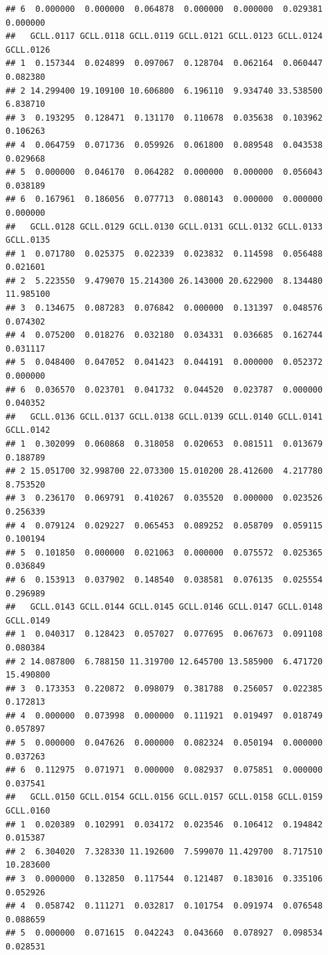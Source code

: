 \documentclass[
]{article}
\begin{document}
\begin{verbatim}
## 6  0.000000  0.000000  0.064878  0.000000  0.000000  0.029381  0.000000
##   GCLL.0117 GCLL.0118 GCLL.0119 GCLL.0121 GCLL.0123 GCLL.0124 GCLL.0126
## 1  0.157344  0.024899  0.097067  0.128704  0.062164  0.060447  0.082380
## 2 14.299400 19.109100 10.606800  6.196110  9.934740 33.538500  6.838710
## 3  0.193295  0.128471  0.131170  0.110678  0.035638  0.103962  0.106263
## 4  0.064759  0.071736  0.059926  0.061800  0.089548  0.043538  0.029668
## 5  0.000000  0.046170  0.064282  0.000000  0.000000  0.056043  0.038189
## 6  0.167961  0.186056  0.077713  0.080143  0.000000  0.000000  0.000000
##   GCLL.0128 GCLL.0129 GCLL.0130 GCLL.0131 GCLL.0132 GCLL.0133 GCLL.0135
## 1  0.071780  0.025375  0.022339  0.023832  0.114598  0.056488  0.021601
## 2  5.223550  9.479070 15.214300 26.143000 20.622900  8.134480 11.985100
## 3  0.134675  0.087283  0.076842  0.000000  0.131397  0.048576  0.074302
## 4  0.075200  0.018276  0.032180  0.034331  0.036685  0.162744  0.031117
## 5  0.048400  0.047052  0.041423  0.044191  0.000000  0.052372  0.000000
## 6  0.036570  0.023701  0.041732  0.044520  0.023787  0.000000  0.040352
##   GCLL.0136 GCLL.0137 GCLL.0138 GCLL.0139 GCLL.0140 GCLL.0141 GCLL.0142
## 1  0.302099  0.060868  0.318058  0.020653  0.081511  0.013679  0.188789
## 2 15.051700 32.998700 22.073300 15.010200 28.412600  4.217780  8.753520
## 3  0.236170  0.069791  0.410267  0.035520  0.000000  0.023526  0.256339
## 4  0.079124  0.029227  0.065453  0.089252  0.058709  0.059115  0.100194
## 5  0.101850  0.000000  0.021063  0.000000  0.075572  0.025365  0.036849
## 6  0.153913  0.037902  0.148540  0.038581  0.076135  0.025554  0.296989
##   GCLL.0143 GCLL.0144 GCLL.0145 GCLL.0146 GCLL.0147 GCLL.0148 GCLL.0149
## 1  0.040317  0.128423  0.057027  0.077695  0.067673  0.091108  0.080384
## 2 14.087800  6.788150 11.319700 12.645700 13.585900  6.471720 15.490800
## 3  0.173353  0.220872  0.098079  0.381788  0.256057  0.022385  0.172813
## 4  0.000000  0.073998  0.000000  0.111921  0.019497  0.018749  0.057897
## 5  0.000000  0.047626  0.000000  0.082324  0.050194  0.000000  0.037263
## 6  0.112975  0.071971  0.000000  0.082937  0.075851  0.000000  0.037541
##   GCLL.0150 GCLL.0154 GCLL.0156 GCLL.0157 GCLL.0158 GCLL.0159 GCLL.0160
## 1  0.020389  0.102991  0.034172  0.023546  0.106412  0.194842  0.015387
## 2  6.304020  7.328330 11.192600  7.599070 11.429700  8.717510 10.283600
## 3  0.000000  0.132850  0.117544  0.121487  0.183016  0.335106  0.052926
## 4  0.058742  0.111271  0.032817  0.101754  0.091974  0.076548  0.088659
## 5  0.000000  0.071615  0.042243  0.043660  0.078927  0.098534  0.028531

\end{verbatim}
\end{document}
